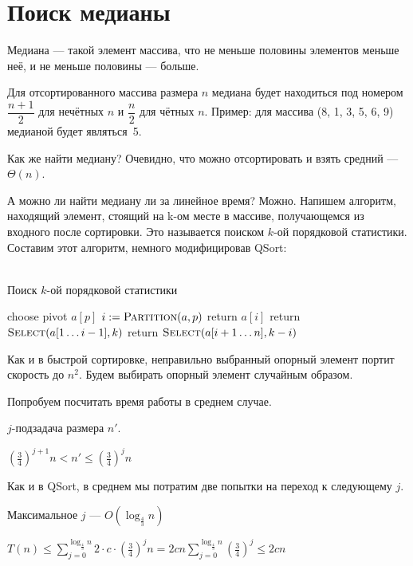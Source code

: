 \documentclass[12pt,a4paper]{article}
\begin{document}
\section*{Поиск медианы}

Медиана --- такой элемент массива, что не меньше половины элементов меньше неё, и не меньше половины --- больше.

Для отсортированного массива размера $n$ медиана будет  находиться под номером $\dfrac{n + 1}{2}$ для нечётных $n$ и $\dfrac{n}{2}$ для чётных $n$.
Пример: для массива (8, 1, 3, 5, 6, 9) медианой будет являться~5.

Как же найти медиану?
Очевидно, что можно отсортировать и взять средний --- $\Theta(n)$.

А можно ли найти медиану ли за линейное время?
Можно.
Напишем алгоритм, находящий элемент, стоящий на k-ом месте в массиве, получающемся из входного после сортировки.
Это называется поиском $k$-ой порядковой статистики.
Составим этот алгоритм, немного модифицировав QSort:\\\\

\begin{algorithm}
\caption{Поиск $k$-ой порядковой статистики}
\begin{algorithmic}[1]
	\State choose pivot $a[p]$
	\State $i \mathrel{:=} \textsc{Partition}(a, p)$
		\State return $a[i]$	
	\EndIf
		\State return $\textsc{Select}(a[1 \ldots i - 1], k)$
	\Else
		\State return $\textsc{Select}(a[i + 1 \ldots n], k - i)$
	\EndIf
\EndFunction
\end{algorithmic}
\end{algorithm}



Как и в быстрой сортировке, неправильно выбранный опорный элемент портит скорость до $n^2$. Будем выбирать опорный элемент случайным образом.

Попробуем посчитать время работы в среднем случае.

$j$-подзадача размера $n'$.

$\left( \frac{3}{4} \right)^{j+1}n < n' \leqslant \left( \frac{3}{4} \right)^{j}n$

Как и в QSort, в среднем мы потратим две попытки на переход к следующему $j$.

Максимальное $j$ --- $O(\log_\frac{4}{3} n)$

$T(n) \leqslant \sum\limits_{j=0}^{\log_{\frac{4}{3}}n} 2\cdot c\cdot \left( \frac{3}{4} \right)^jn = 2cn\sum\limits_{j=0}^{\log_{\frac{4}{3}}n}\left( \frac{3}{4} \right)^j \leqslant 2cn$
\end{document}
